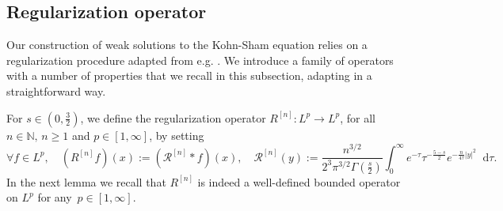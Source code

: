 \documentclass[12pt,a4paper]{amsart}
\numberwithin{equation}{section}
\newcommand*\diff{\mathop{}\!\mathrm{d}}
\begin{document}
	
	
	
	
	
	
	\subsection{Regularization operator}\label{subsec:regul}
	
	
	Our construction of weak solutions to the Kohn-Sham equation relies on a regularization procedure adapted from e.g. \cite{cazenave1988cauchy,strauss1970weak}. %
	We introduce a family of operators with a number of properties that we recall in this subsection,  adapting \cite[Section 6.1.2]{grafakos2009modern} in a straightforward way. 
	
	For $s\in(0,\frac32)$, we define the regularization operator $R^{[n]}:L^p\to L^p$, for all $n\in\mathbb{N}, \, n \geq 1$ and $p\in[1,\infty]$, by setting
	\begin{equation}
		\forall f \in L^p, \quad (R^{[n]}f)(x) := ( \mathcal{R}^{[n]} \ast f ) (x) , \quad \mathcal{R}^{[n]}(y) := \frac{n^{3/2}}{2^{3} \pi^{3/2} \Gamma(\frac{s}{2})} \int_{0}^{\infty}  e^{-\tau} \tau^{-\frac{5-s}{2}} e^{-\frac{n}{4 \tau} |y|^2} \diff \tau .
	\end{equation}
	In the next lemma we recall that $R^{[n]}$ is indeed a well-defined bounded operator on $L^p$ for any~$p\in[1,\infty]$. 
	
\end{document}
